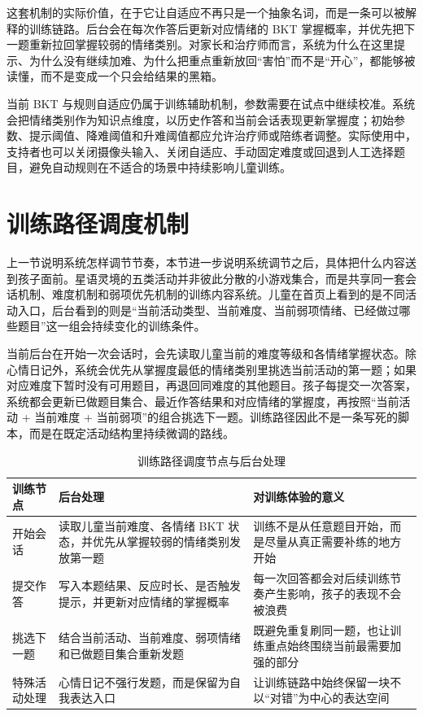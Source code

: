 这套机制的实际价值，在于它让自适应不再只是一个抽象名词，而是一条可以被解释的训练链路。后台会在每次作答后更新对应情绪的 BKT 掌握概率，并优先把下一题重新拉回掌握较弱的情绪类别。对家长和治疗师而言，系统为什么在这里提示、为什么没有继续加难、为什么把重点重新放回“害怕”而不是“开心”，都能够被读懂，而不是变成一个只会给结果的黑箱。

当前 BKT 与规则自适应仍属于训练辅助机制，参数需要在试点中继续校准。系统会把情绪类别作为知识点维度，以历史作答和当前会话表现更新掌握度；初始参数、提示阈值、降难阈值和升难阈值都应允许治疗师或陪练者调整。实际使用中，支持者也可以关闭摄像头输入、关闭自适应、手动固定难度或回退到人工选择题目，避免自动规则在不适合的场景中持续影响儿童训练。

\section{训练路径调度机制}
上一节说明系统怎样调节节奏，本节进一步说明系统调节之后，具体把什么内容送到孩子面前。星语灵境的五类活动并非彼此分散的小游戏集合，而是共享同一套会话机制、难度机制和弱项优先机制的训练内容系统。儿童在首页上看到的是不同活动入口，后台看到的则是“当前活动类型、当前难度、当前弱项情绪、已经做过哪些题目”这一组会持续变化的训练条件。

当前后台在开始一次会话时，会先读取儿童当前的难度等级和各情绪掌握状态。除心情日记外，系统会优先从掌握度最低的情绪类别里挑选当前活动的第一题；如果对应难度下暂时没有可用题目，再退回同难度的其他题目。孩子每提交一次答案，系统都会更新已做题目集合、最近作答结果和对应情绪的掌握度，再按照“当前活动 + 当前难度 + 当前弱项”的组合挑选下一题。训练路径因此不是一条写死的脚本，而是在既定活动结构里持续微调的路线。


\begin{table}[H]
\centering
\caption{训练路径调度节点与后台处理}
\small
\begin{tabularx}{0.96\textwidth}{>{\raggedright\arraybackslash}p{} >{\raggedright\arraybackslash}p{} X}
\toprule
训练节点 & 后台处理 & 对训练体验的意义 \\
\midrule
开始会话 & 读取儿童当前难度、各情绪 BKT 状态，并优先从掌握较弱的情绪类别发放第一题 & 训练不是从任意题目开始，而是尽量从真正需要补练的地方开始 \\
提交作答 & 写入本题结果、反应时长、是否触发提示，并更新对应情绪的掌握概率 & 每一次回答都会对后续训练节奏产生影响，孩子的表现不会被浪费 \\
挑选下一题 & 结合当前活动、当前难度、弱项情绪和已做题目集合重新发题 & 既避免重复刷同一题，也让训练重点始终围绕当前最需要加强的部分 \\
特殊活动处理 & 心情日记不强行发题，而是保留为自我表达入口 & 让训练链路中始终保留一块不以“对错”为中心的表达空间 \\
\bottomrule
\end{tabularx}
\end{table}

